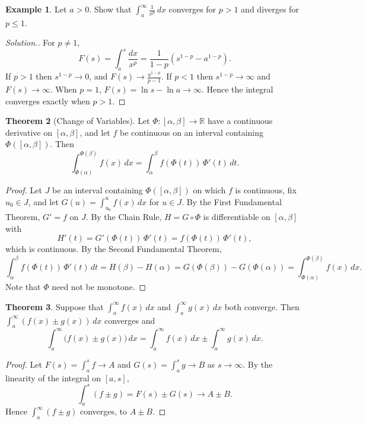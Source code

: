 \documentclass[11pt,a4paper]{article}
\numberwithin{equation}{section}
\theoremstyle{definition}
\newtheorem{thm}{Theorem}[subsection]
\newtheorem{exa}[thm]{Example}
\newenvironment{solution}
  {\renewcommand{\qedsymbol}{}\begin{proof}[\textit{Solution}.]}
  {\end{proof}}
\begin{document}
\begin{exa}
Let $a>0$. Show that $\int_a^{\infty}\frac{1}{x^p}\,dx$ converges for $p>1$ and diverges for $p\leq 1$.
\end{exa}

\begin{solution}
For $p\neq1$,
$$F(s) = \int^s_a\frac{dx}{x^p} = \frac{1}{1 - p}\left(s^{1-p} - a^{1-p}\right).$$
If $p>1$ then $s^{1-p}\longrightarrow 0$, and $F(s)\longrightarrow \frac{a^{1-p}}{p-1}$. If $p<1$ then $s^{1-p}\longrightarrow\infty$ and $F(s)\longrightarrow\infty$. When $p = 1$, $F(s) = \ln s - \ln a\longrightarrow \infty$. Hence the integral converges exactly when $p>1$.
\end{solution}


\begin{thm}[Change of Variables]
Let $\Phi: [\alpha, \beta]\longrightarrow \mathbb{R}$ have a continuous derivative on $[\alpha,\beta]$, and let $f$ be continuous on an interval containing $\Phi([\alpha,\beta])$. Then
$$\int^{\Phi(\beta)}_{\Phi(\alpha)}f(x)\, dx = \int^{\beta}_{\alpha}f(\Phi (t))\, \Phi'(t)\, dt .$$
\end{thm}

\begin{proof}
Let $J$ be an interval containing $\Phi([\alpha,\beta])$ on which $f$ is continuous, fix $u_0\in J$, and let $G(u) = \int_{u_0}^uf(x)\,dx$ for $u\in J$. By the First Fundamental Theorem, $G' = f$ on $J$. By the Chain Rule, $H = G\circ\Phi$ is differentiable on $[\alpha,\beta]$ with
$$H'(t) = G'(\Phi(t))\,\Phi'(t) = f(\Phi(t))\,\Phi'(t),$$
which is continuous. By the Second Fundamental Theorem,
$$\int^{\beta}_{\alpha}f(\Phi (t))\, \Phi'(t)\, dt = H(\beta) - H(\alpha) = G(\Phi(\beta)) - G(\Phi(\alpha)) = \int^{\Phi(\beta)}_{\Phi(\alpha)}f(x)\, dx .$$
Note that $\Phi$ need not be monotone.
\end{proof}


\begin{thm}
Suppose that $\int^{\infty}_af(x)\, dx$ and $\int^{\infty}_ag(x)\, dx$ both converge. Then $\int^{\infty}_a(f(x)\pm g(x))\, dx$ converges and
$$\int^{\infty}_a\bigl(f(x) \pm g(x)\bigr)\, dx   = \int^{\infty}_af(x)\, dx \pm \int^{\infty}_ag(x)\, dx .$$
\end{thm}

\begin{proof}
Let $F(s) = \int_a^s f\longrightarrow A$ and $G(s) = \int_a^sg\longrightarrow B$ as $s\longrightarrow\infty$. By the linearity of the integral on $[a,s]$,
$$\int^s_a(f\pm g) = F(s)\pm G(s)\longrightarrow A\pm B .$$
Hence $\int^{\infty}_a(f\pm g)$ converges, to $A\pm B$.
\end{proof}
\end{document}
